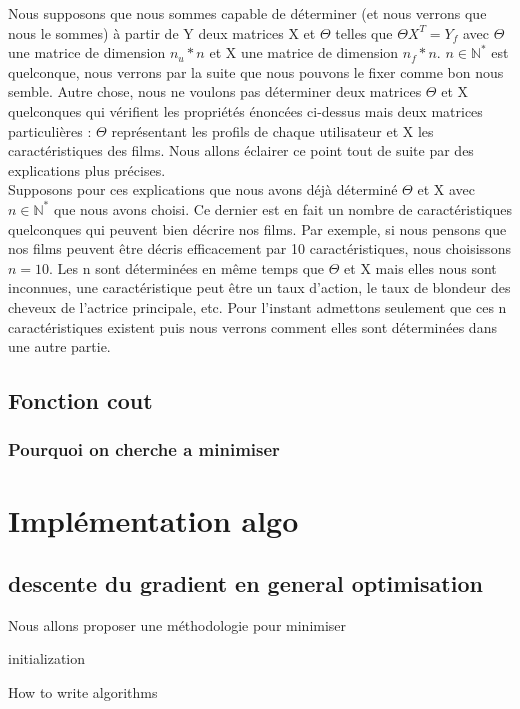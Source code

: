 \documentclass[a4paper,10pt]{article}
\begin{document}
Nous supposons que nous sommes capable de déterminer (et nous verrons que nous le sommes) à partir de Y deux matrices X et $\Theta$ telles que $\Theta X^T = Y_f$ avec $\Theta$ une matrice de dimension $n_u * n$ et X une matrice de dimension $n_f * n$. $n \in \mathbb{N}^*$ est quelconque, nous verrons par la suite que nous pouvons le fixer comme bon nous semble. 
Autre chose, nous ne voulons pas déterminer deux matrices $\Theta$ et X quelconques qui vérifient les propriétés énoncées ci-dessus mais deux matrices particulières : $\Theta$ représentant les profils de chaque utilisateur et X les caractéristiques des films. Nous allons éclairer ce point tout de suite par des explications plus précises.\\ 
 
Supposons pour ces explications que nous avons déjà déterminé $\Theta$ et X avec $n \in \mathbb{N}^*$ que nous avons choisi. Ce dernier est en fait un nombre de caractéristiques quelconques qui peuvent bien décrire nos films. Par exemple, si nous pensons que nos films peuvent être décris efficacement par 10 caractéristiques, nous choisissons $n = 10$. 
Les n sont déterminées en même temps que $\Theta$ et X mais elles nous sont inconnues, une caractéristique peut être un taux d'action, le taux de blondeur des cheveux de l'actrice principale, etc. Pour l'instant admettons seulement que ces n caractéristiques existent puis nous verrons comment elles sont déterminées dans une autre partie. 



\subsection{Fonction cout}
\subsubsection{Pourquoi on cherche a minimiser}
\section{Implémentation algo}
\subsection{descente du gradient en general optimisation}
Nous allons proposer une méthodologie pour minimiser 
\begin{algorithm}[H]
 initialization\;
 \caption{How to write algorithms}
\end{algorithm}
\end{document}
